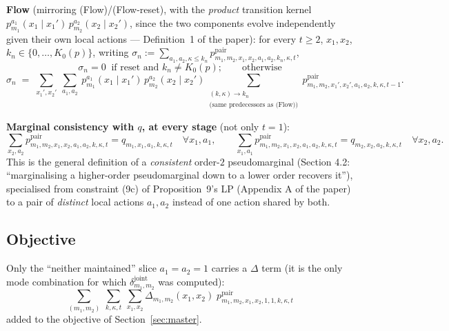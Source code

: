 \documentclass[11pt]{article}
\begin{document}
\textbf{Flow} (mirroring (Flow)/(Flow-reset), with the \emph{product} transition kernel
$p_{m_1}^{a_1}(x_1\mid x_1') \, p_{m_2}^{a_2}(x_2\mid x_2')$, since the two components
evolve independently given their own local actions --- Definition~1 of the paper): for
every $t \ge 2$, $x_1, x_2$, $k_n \in \{0,\dots,K_0(p)\}$, writing
$\sigma_n := \sum_{a_1,a_2,\kappa \le k_n} p^{\mathrm{pair}}_{m_1,m_2,x_1,x_2,a_1,a_2,k_n,\kappa,t}$,
\[
  \sigma_n = 0 \ \text{ if reset and } k_n \ne K_0(p); \qquad \text{otherwise}
\]
\[
  \sigma_n \;=\; \sum_{x_1',x_2'}\ \sum_{a_1,a_2}\ p_{m_1}^{a_1}(x_1\mid x_1')\,
  p_{m_2}^{a_2}(x_2\mid x_2') \!\!
  \sum_{\substack{(k,\kappa) \to k_n \\ \text{(same predecessors as (Flow))}}} \!\!
  p^{\mathrm{pair}}_{m_1,m_2,x_1',x_2',a_1,a_2,k,\kappa,t-1}.
\]

\textbf{Marginal consistency with $q$, at every stage} (not only $t=1$):
\[
  \sum_{x_2,a_2} p^{\mathrm{pair}}_{m_1,m_2,x_1,x_2,a_1,a_2,k,\kappa,t} = q_{m_1,x_1,a_1,k,\kappa,t}
  \quad \forall x_1, a_1, \qquad
  \sum_{x_1,a_1} p^{\mathrm{pair}}_{m_1,m_2,x_1,x_2,a_1,a_2,k,\kappa,t} = q_{m_2,x_2,a_2,k,\kappa,t}
  \quad \forall x_2, a_2.
\]
This is the general definition of a \emph{consistent} order-$2$ pseudomarginal (Section
4.2: ``marginalising a higher-order pseudomarginal down to a lower order recovers it''),
specialised from constraint (9c) of Proposition~9's LP (Appendix A of the paper) to a pair
of \emph{distinct} local actions $a_1,a_2$ instead of one action shared by both.

\subsection*{Objective}
Only the ``neither maintained'' slice $a_1=a_2=1$ carries a $\Delta$ term (it is the only
mode combination for which $\delta^{\mathrm{joint}}_{m_1,m_2}$ was computed):
\[
  \sum_{(m_1,m_2)} \ \sum_{k,\kappa,t} \ \sum_{x_1,x_2}
  \Delta_{m_1,m_2}(x_1,x_2)\; p^{\mathrm{pair}}_{m_1,m_2,x_1,x_2,1,1,k,\kappa,t}
\]
added to the objective of Section~\ref{sec:master}.
\end{document}
